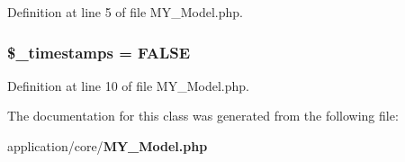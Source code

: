 Definition at line 5 of file M\-Y\-\_\-\-Model.\-php.

\subsubsection[{\$\-\_\-timestamps}]{\setlength{\rightskip}{0pt plus 5cm}\$\-\_\-timestamps = F\-A\-L\-S\-E\hspace{0.3cm}{\ttfamily [protected]}}\label{class_m_y___model_aa701f5b72d73b3c5a7516cd6221c60cc}


Definition at line 10 of file M\-Y\-\_\-\-Model.\-php.



The documentation for this class was generated from the following file\-:\begin{DoxyCompactItemize}
\item 
application/core/{\bf M\-Y\-\_\-\-Model.\-php}\end{DoxyCompactItemize}
